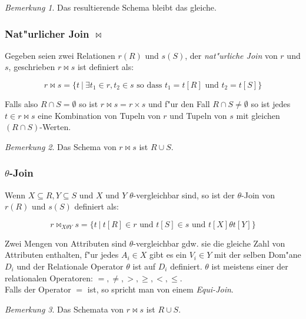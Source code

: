 \documentclass[german, 10pt, a4paper, twocolumn]{scrartcl}
\theoremstyle{definition}
\theoremstyle{remark}
\newtheorem*{remark}{Bemerkung}
\theoremstyle{example}
\begin{document}
\begin{remark}
	Das resultierende Schema bleibt das gleiche.
\end{remark}

\subsubsection{Nat"urlicher Join $\bowtie$}

Gegeben seien zwei Relationen $r(R)$ und $s(S)$, der \textit{nat"urliche Join} von $r$ und $s$, geschrieben $r\bowtie s$ ist definiert als:

\begin{displaymath}
	r \bowtie s = \{ t \ | \ \exists t_1 \in r, t_2 \in s \text{ so dass } t_1=t[R] \text{ und } t_2=t[S] \}
\end{displaymath}

Falls also $R\cap S= \emptyset$ so ist $r\bowtie s = r \times s$ und f"ur den Fall $R\cap S \neq \emptyset$ so ist jedes $t\in r\bowtie s$ eine Kombination von Tupeln von $r$ und Tupeln von $s$ mit gleichen $(R\cap S)$-Werten.

\begin{remark}
	Das Schema von $r\bowtie s$ ist $R \cup S$.
\end{remark}


\subsubsection{$\theta$-Join}

Wenn $X \subseteq R, Y \subseteq S$ und $X$ und $Y$ $\theta$-vergleichbar sind, so ist der $\theta$-Join von $r(R)$ und $s(S)$ definiert als:

\begin{displaymath}
	r \bowtie_{X \theta Y} s = \{ t \ | \ t[R] \in r \text{ und } t[S]\in s \text{ und } t[X]\theta t[Y] \}
\end{displaymath}

Zwei Mengen von Attributen sind $\theta$-vergleichbar gdw. sie die gleiche Zahl von Attributen enthalten, f"ur jedes $A_i\in X$ gibt es ein $V_i \in Y$ mit der selben Dom"ane $D_i$ und der Relationale Operator $\theta$ ist auf $D_i$ definiert. $\theta$ ist meistens einer der relationalen Operatoren: $=, \neq, >, \geq, <, \leq$.\\
Falls der Operator $=$ ist, so spricht man von einem \textit{Equi-Join}.

\begin{remark}
	Das Schemata von $r\bowtie s$ ist $R \cup S$.
\end{remark}
\end{document}
